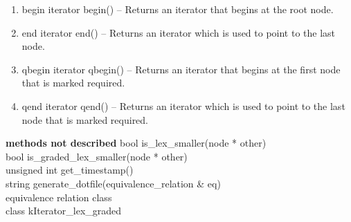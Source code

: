 \begin{enumerate}
\item \begin{detail}
{begin}
{iterator begin()}
{--}
{Returns an iterator that begins at the root node.} 
\end{detail}
\item \begin{detail}
{end}
{iterator end()}
{--}
{Returns an iterator which is used to point to the last node.} 
\end{detail}
\item \begin{detail}
{qbegin}
{iterator qbegin()}
{--}
{Returns an iterator that begins at the first node that is marked required.} 
\end{detail}
\item \begin{detail}
{qend}
{iterator qend()}
{--}
{Returns an iterator which is used to point to the last node that is marked required.} 
\end{detail}
\end{enumerate}

\textbf{methods not described} \vskip 1pt
bool is\_lex\_smaller(node * other) \\
bool is\_graded\_lex\_smaller(node * other) \\
unsigned int get\_timestamp() \\
string generate\_dotfile(equivalence\_relation \& eq) \\
equivalence relation class\\
class kIterator\_lex\_graded 
